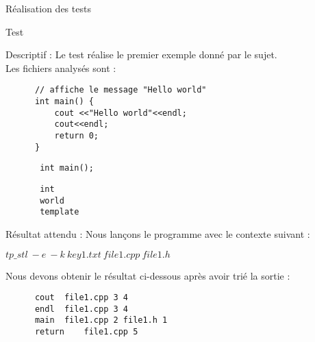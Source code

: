 \documentclass{article}
\begin{document}
\newpage 
\begin{section}{Réalisation des tests}

 \begin{subsection}{Test }
    \begin{paragraph}{Descriptif :}
      Le test  réalise le premier exemple donné par le sujet.\\ Les fichiers analysés sont : 
      
      \begin{listing}[h!]
      \begin{verbatim}
	  // affiche le message "Hello world"
	  int main() {
	      cout <<"Hello world"<<endl;
	      cout<<endl;
	      return 0;
	  }
      \end{verbatim}
      \end{listing}
      
      \begin{listing}[h!]
	\begin{verbatim}
	   int main();
	\end{verbatim}
      \end{listing}
      
        \begin{listing}[h!]
	\begin{verbatim}
	   int
	   world
	   template
	\end{verbatim}
      \end{listing}
      
    \end{paragraph}
    
    \begin{paragraph}{Résultat attendu :} 
      Nous lançons le programme avec le contexte suivant :  
       \begin{center}
	\textbf{$tp\_stl\ -e\ -k\ key1.txt\ file1.cpp\ file1.h$}
      \end{center}
      
      Nous devons obtenir le résultat ci-dessous après avoir trié la sortie : 
      \begin{listing}[h!]
      \begin{verbatim}
	  cout	file1.cpp 3 4	
	  endl	file1.cpp 3 4	
	  main	file1.cpp 2	file1.h 1	
	  return	file1.cpp 5	
      \end{verbatim}
  

\end{listing}
\end{paragraph}
\end{subsection}
\end{section}
\end{document}
